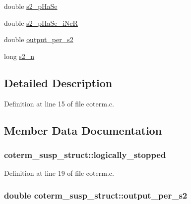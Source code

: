 \begin{DoxyCompactItemize}
\item 
double \hyperlink{structcoterm__susp__struct_a2a6a09b264ba9911e4ffef5939906bf3}{s2\+\_\+p\+Ha\+Se}
\item 
double \hyperlink{structcoterm__susp__struct_a2c4ea8194e475ddcbcbb49eaf447fe14}{s2\+\_\+p\+Ha\+Se\+\_\+i\+NcR}
\item 
double \hyperlink{structcoterm__susp__struct_a0cc706a27bed46968fcc624dd109a63a}{output\+\_\+per\+\_\+s2}
\item 
long \hyperlink{structcoterm__susp__struct_ac37dbe3877f42b4e869444c455465a9a}{s2\+\_\+n}
\end{DoxyCompactItemize}


\subsection{Detailed Description}


Definition at line 15 of file coterm.\+c.



\subsection{Member Data Documentation}
\subsubsection[{\texorpdfstring{logically\+\_\+stopped}{logically_stopped}}]{ coterm\+\_\+susp\+\_\+struct\+::logically\+\_\+stopped}\hypertarget{structcoterm__susp__struct_aa87096e6b267e63a7f4801543533836b}{}\label{structcoterm__susp__struct_aa87096e6b267e63a7f4801543533836b}


Definition at line 19 of file coterm.\+c.

\subsubsection[{\texorpdfstring{output\+\_\+per\+\_\+s2}{output_per_s2}}]{\setlength{\rightskip}{0pt plus 5cm}double coterm\+\_\+susp\+\_\+struct\+::output\+\_\+per\+\_\+s2}\hypertarget{structcoterm__susp__struct_a0cc706a27bed46968fcc624dd109a63a}{}\label{structcoterm__susp__struct_a0cc706a27bed46968fcc624dd109a63a}


